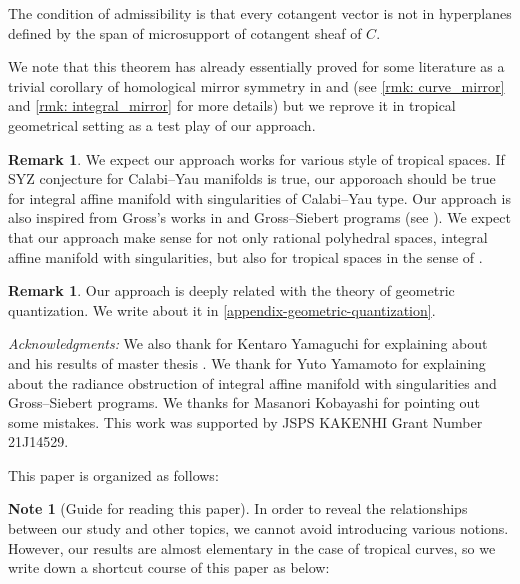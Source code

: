 \documentclass[a4paper,dvipdfmx,reqno,12pt]{amsart}
\theoremstyle{definition}
\newtheorem{Note}[theorem]{Note}
\newtheorem{remark}[theorem]{Remark}
\numberwithin{equation}{section}
\begin{document}
The condition of admissibility is that every cotangent vector 
is not in hyperplanes defined by the span of microsupport of
cotangent sheaf of $C$. 


We note that this theorem has already essentially proved for some
literature as a trivial corollary of homological mirror symmetry 
in \cite{MR4301560} and \cite{auroux2022lagrangian} (see \cref{rmk: curve_mirror} and \cref{rmk: integral_mirror} 
for more details) but we reprove it in tropical  
geometrical setting as a test play of our approach.

\begin{remark}
We expect our approach works for various style 
of tropical spaces. 
If SYZ conjecture for Calabi--Yau manifolds
is true, our apporoach should
be true for integral affine manifold 
with singularities of Calabi--Yau type.
Our approach is 
also inspired from Gross's 
works in 
\cite{grossSpecialLagrangianFibrations1998a} and Gross--Siebert programs
(see \cite[Conjecture 1.6]{MR3525095}).
We expect that 
our approach make sense for not only rational polyhedral
spaces, integral affine manifold with singularities,
but also for tropical spaces 
in the sense of \cite[Definition 2.8]{cavalieri2020tropical}.

\end{remark}

\begin{remark}
Our approach is deeply related with the theory of
geometric quantization. We write about it in 
\cref{appendix-geometric-quantization}.
\end{remark}

\textit{Acknowledgments:}
We also thank for Kentaro Yamaguchi for explaining about
\cite{MR4234675} and his results of master thesis 
\cite{yamaguchimaster}. We thank for Yuto Yamamoto for
explaining about the radiance obstruction of integral 
affine manifold with singularities and Gross--Siebert
programs. We thanks for Masanori Kobayashi for 
pointing out some mistakes. 
This work was supported by JSPS KAKENHI 
Grant Number 21J14529.

This paper is organized as follows:

\begin{Note}[Guide for reading this paper]
  In order to reveal the relationships between our study
  and other topics, we cannot avoid introducing various
  notions. However, our results are almost elementary
in the case of tropical curves,
  so we write down a shortcut course of this paper as below:
\end{Note}
\end{document}
